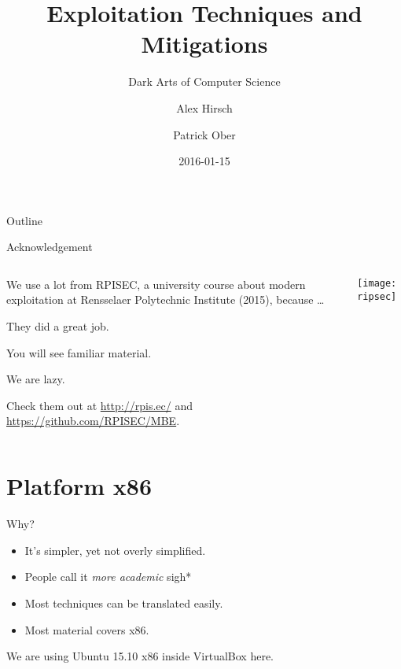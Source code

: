 \documentclass[beamer]{uibk}
\title{Exploitation Techniques and Mitigations}
\subtitle{Dark Arts of Computer Science}
\author{Alex Hirsch \and Patrick Ober}
\date{2016-01-15}
\begin{document}
\maketitle

\begin{frame}{Outline}
    \begin{multicols}{2}
        \tableofcontents
    \end{multicols}
\end{frame}

\begin{frame}{Acknowledgement}
    \begin{columns}
        \begin{column}{0.5\textwidth}
            We use a lot from RPISEC, a university course about modern
            exploitation at Rensselaer Polytechnic Institute (2015), because
            \dots

            \begin{description}
                \item<1->[of them:] They did a great job.
                \item<2->[of you:] You will see familiar material.
                \item<3->[of us:] We are lazy.
            \end{description}

            Check them out at \url{http://rpis.ec/} and
            \url{https://github.com/RPISEC/MBE}.
        \end{column}
        \begin{column}{0.5\textwidth}
            \texttt{[image: ripsec]}
        \end{column}
    \end{columns}
\end{frame}

\section{Platform x86}

\begin{frame}{Why?}
    \begin{itemize}
        \item It's simpler, yet not overly simplified.
        \item People call it \emph{more academic} \quad *sigh*
        \item Most techniques can be translated easily.
        \item Most material covers x86.
    \end{itemize}
    \bigskip
    We are using Ubuntu 15.10 x86 inside VirtualBox here.
\end{frame}
\end{document}
